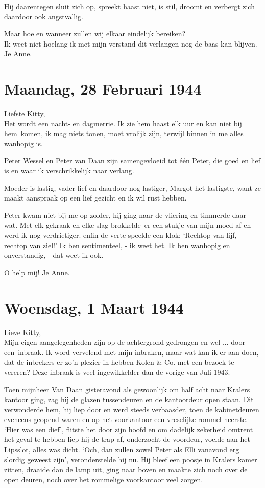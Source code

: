 \documentclass{book}
\begin{document}
Hij daarentegen sluit zich op, spreekt haast niet, is stil, droomt en verbergt
zich daardoor ook angstvallig.

Maar hoe en wanneer zullen wij elkaar eindelijk bereiken?\\
Ik weet niet hoelang
ik met mijn verstand dit verlangen nog de baas kan blijven. Je Anne.

\section*{Maandag, 28 Februari 1944}

Liefste Kitty,\\
Het wordt een nacht- en dagmerrie. Ik zie hem haast elk uur en
kan niet bij hem~komen, ik mag niets tonen, moet vrolijk zijn, terwijl binnen in
me alles wanhopig is.

Peter Wessel en Peter van Daan zijn samengevloeid tot één Peter, die goed en
lief is en waar ik verschrikkelijk naar verlang.

Moeder is lastig, vader lief en daardoor nog lastiger, Margot het lastigste,
want ze maakt aanspraak op een lief gezicht en ik wil rust hebben.

Peter kwam niet bij me op zolder, hij ging naar de vliering en timmerde daar
wat. Met elk gekraak en elke slag brokkelde~er een stukje van mijn moed af en
werd ik nog verdrietiger. enfin de verte speelde een klok: `Rechtop van lijf,
rechtop van ziel!' Ik ben sentimenteel, - ik weet het. Ik ben wanhopig en
onverstandig, - dat weet ik ook.

O help mij! Je Anne.

\section*{Woensdag, 1 Maart 1944}

Lieve Kitty,\\
Mijn eigen aangelegenheden zijn op de achtergrond gedrongen en
wel ... door een~inbraak. Ik word vervelend met mijn inbraken, maar wat kan ik
er aan doen, dat de inbrekers er zo'n plezier in hebben Kolen \& Co. met een
bezoek te vereren? Deze inbraak is veel ingewikkelder dan de vorige van Juli
1943.

Toen mijnheer Van Daan gisteravond als gewoonlijk om half acht naar Kralers
kantoor ging, zag hij de glazen tussendeuren en de kantoordeur open staan. Dit
verwonderde hem, hij liep door en werd steeds verbaasder, toen de kabinetdeuren
eveneens geopend waren en op het voorkantoor een vreselijke rommel heerste.
`Hier was een dief', flitste het door zijn hoofd en om dadelijk zekerheid
omtrent het geval te hebben liep hij de trap af, onderzocht de voordeur, voelde
aan het Lipsslot, alles was dicht. `Och, dan zullen zowel Peter als Elli
vanavond erg slordig geweest zijn', veronderstelde hij nu. Hij bleef een poosje
in Kralers kamer zitten, draaide dan de lamp uit, ging naar boven en maakte zich
noch over de open deuren, noch over het rommelige voorkantoor veel zorgen.
\end{document}
